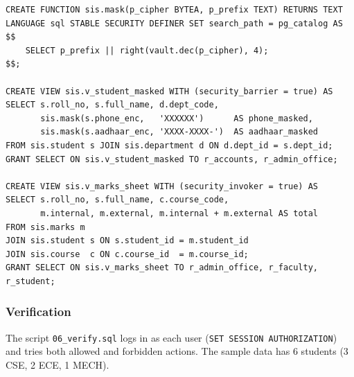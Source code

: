\documentclass[11pt,a4paper]{report}
\begin{document}
\begin{lstlisting}[caption={Masking view and invoker-rights view}]
CREATE FUNCTION sis.mask(p_cipher BYTEA, p_prefix TEXT) RETURNS TEXT
LANGUAGE sql STABLE SECURITY DEFINER SET search_path = pg_catalog AS $$
    SELECT p_prefix || right(vault.dec(p_cipher), 4);
$$;

CREATE VIEW sis.v_student_masked WITH (security_barrier = true) AS
SELECT s.roll_no, s.full_name, d.dept_code,
       sis.mask(s.phone_enc,   'XXXXXX')      AS phone_masked,
       sis.mask(s.aadhaar_enc, 'XXXX-XXXX-')  AS aadhaar_masked
FROM sis.student s JOIN sis.department d ON d.dept_id = s.dept_id;
GRANT SELECT ON sis.v_student_masked TO r_accounts, r_admin_office;

CREATE VIEW sis.v_marks_sheet WITH (security_invoker = true) AS
SELECT s.roll_no, s.full_name, c.course_code,
       m.internal, m.external, m.internal + m.external AS total
FROM sis.marks m
JOIN sis.student s ON s.student_id = m.student_id
JOIN sis.course  c ON c.course_id  = m.course_id;
GRANT SELECT ON sis.v_marks_sheet TO r_admin_office, r_faculty, r_student;
\end{lstlisting}

\subsubsection{Verification}
The script \texttt{06\_verify.sql} logs in as each user (\texttt{SET SESSION AUTHORIZATION}) and tries both allowed and forbidden actions. The sample data has 6 students (3 CSE, 2 ECE, 1 MECH).
\end{document}
